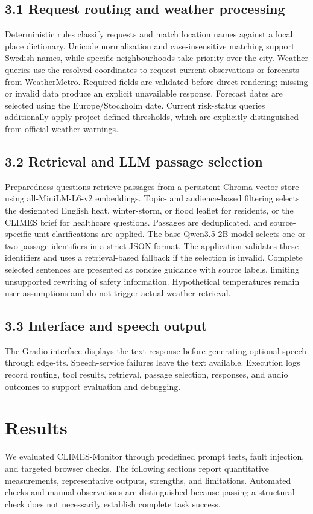 \documentclass[a4paper,10pt]{article}
\begin{document}
\subsection*{3.1 Request routing and weather processing}
Deterministic rules classify requests and match location names against a local place dictionary. Unicode normalisation and case-insensitive matching support Swedish names, while specific neighbourhoods take priority over the city. Weather queries use the resolved coordinates to request current observations or forecasts from WeatherMetro. Required fields are validated before direct rendering; missing or invalid data produce an explicit unavailable response. Forecast dates are selected using the Europe/Stockholm date. Current risk-status queries additionally apply project-defined thresholds, which are explicitly distinguished from official weather warnings.


\subsection*{3.2 Retrieval and LLM passage selection}
Preparedness questions retrieve passages from a persistent Chroma vector store using all-MiniLM-L6-v2 embeddings. Topic- and audience-based filtering selects the designated English heat, winter-storm, or flood leaflet for residents, or the CLIMES brief for healthcare questions. Passages are deduplicated, and source-specific unit clarifications are applied. The base Qwen3.5-2B model selects one or two passage identifiers in a strict JSON format. The application validates these identifiers and uses a retrieval-based fallback if the selection is invalid. Complete selected sentences are presented as concise guidance with source labels, limiting unsupported rewriting of safety information. Hypothetical temperatures remain user assumptions and do not trigger actual weather retrieval.

\subsection*{3.3 Interface and speech output}
The Gradio interface displays the text response before generating optional speech through edge-tts. Speech-service failures leave the text available. Execution logs record routing, tool results, retrieval, passage selection, responses, and audio outcomes to support evaluation and debugging.

\section{Results}
We evaluated CLIMES-Monitor through predefined prompt tests, fault injection, and targeted browser checks. The following sections report quantitative measurements, representative outputs, strengths, and limitations. Automated checks and
manual observations are distinguished because passing a structural check does not necessarily establish complete task success. 
\end{document}
